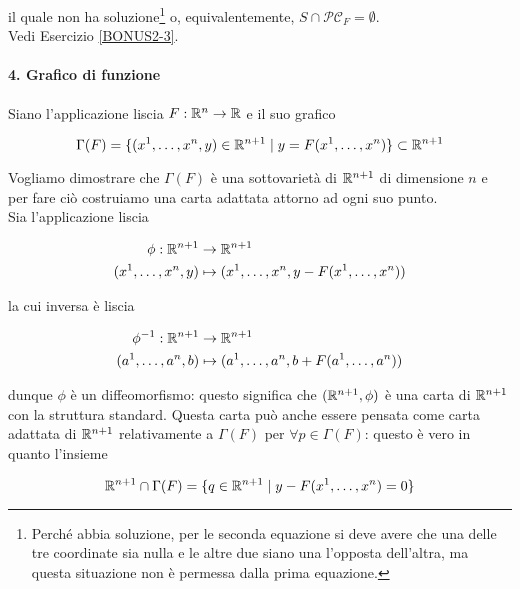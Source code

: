 il quale non ha soluzione\footnote{%
	Perché abbia soluzione, per le seconda equazione si deve avere che una delle tre coordinate sia nulla e le altre due siano una l'opposta dell'altra, ma questa situazione non è permessa dalla prima equazione.%
} o, equivalentemente, $ S \cap \mathcal{PC}_{F} = \emptyset $.\\
Vedi Esercizio \ref{BONUS2-3}.

\paragraph{4. Grafico di funzione}

Siano l'applicazione liscia $ F : \mathbb{R}^{n} \to \mathbb{R} $ e il suo grafico

\begin{equation}
	\Gamma(F) = \{ (x^{1},\dots,x^{n},y) \in \mathbb{R}^{n+1} \mid y = F(x^{1},\dots,x^{n}) \} \subset \mathbb{R}^{n+1}
\end{equation}

Vogliamo dimostrare che $ \Gamma(F) $ è una sottovarietà di $ \mathbb{R}^{n+1} $ di dimensione $ n $ e per fare ciò costruiamo una carta adattata attorno ad ogni suo punto.\\
Sia l'applicazione liscia

\begin{align}
	\begin{split}
		\phi : \mathbb{R}^{n+1} &\to \mathbb{R}^{n+1}\\
		(x^{1},\dots,x^{n},y) &\mapsto (x^{1},\dots,x^{n},y - F(x^{1},\dots,x^{n}))
	\end{split}
\end{align}

la cui inversa è liscia

\begin{align}
	\begin{split}
		\phi^{-1} : \mathbb{R}^{n+1} &\to \mathbb{R}^{n+1}\\
		(a^{1},\dots,a^{n},b) &\mapsto (a^{1},\dots,a^{n},b + F(a^{1},\dots,a^{n}))
	\end{split}
\end{align}

dunque $ \phi $ è un diffeomorfismo: questo significa che $ (\mathbb{R}^{n+1},\phi) $ è una carta di $ \mathbb{R}^{n+1} $ con la struttura standard. Questa carta può anche essere pensata come carta adattata di $ \mathbb{R}^{n+1} $ relativamente a $ \Gamma(F) $ per $ \forall p \in \Gamma(F) $: questo è vero in quanto l'insieme

\begin{equation}
	\mathbb{R}^{n+1} \cap \Gamma(F) = \{ q \in \mathbb{R}^{n+1} \mid y - F(x^{1},\dots,x^{n}) = 0 \}
\end{equation}

